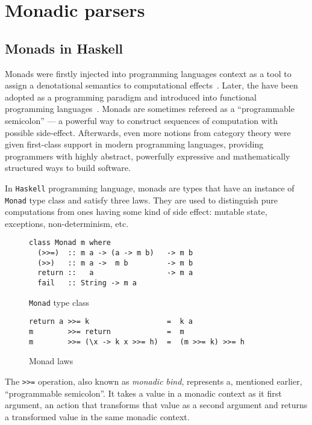   \section{Monadic parsers}
  \label{cpt-parsers:monadic}

    \subsection{Monads in Haskell}
      Monads were firstly injected into programming languages context as a tool to
      assign a denotational semantics to computational effects~\cite{Moggi:1991:NCM:116981.116984}. Later, the have been adopted as a programming
      paradigm and introduced into functional programming languages~\cite{Wadler:1992:EFP:143165.143169}. Monads are sometimes refereed as a ``programmable semicolon'' --- a powerful way to construct sequences of computation with possible side-effect. Afterwards, even more notions from category theory were given first-class support in modern programming languages, providing programmers with highly abstract, powerfully expressive and mathematically structured ways to build software.

      In \texttt{Haskell} programming language, monads are types that have an instance of \texttt{Monad} type class and satisfy three laws. They are used
      to distinguish pure computations from ones having some kind of side effect:
      mutable state, exceptions, non-determinism, etc.

      \begin{figure}[t]
      \begin{lstlisting}
class Monad m where
  (>>=)  :: m a -> (a -> m b)   -> m b
  (>>)   :: m a ->  m b         -> m b
  return ::   a                 -> m a
  fail   :: String -> m a
      \end{lstlisting}
      \caption{\texttt{Monad} type class}
      \label{listing:monadClass}
      \end{figure}

      \begin{figure}[t]
      \begin{lstlisting}
return a >>= k                  =  k a
m        >>= return             =  m
m        >>= (\x -> k x >>= h)  =  (m >>= k) >>= h
      \end{lstlisting}
      \caption{Monad laws}
      \label{listing:monadLaws}
      \end{figure}

      The \lstinline{>>=} operation, also known as \emph{monadic bind}, represents
      a, mentioned earlier, ``programmable semicolon''. It takes a value in a monadic context as it first argument, an action that transforms that value as a second argument and returns a transformed value in the same monadic context.

